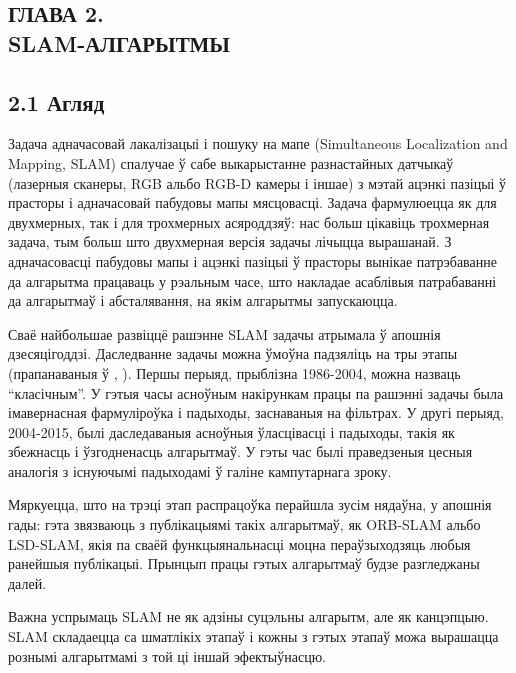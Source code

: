 \begin{center}
    \section*{ГЛАВА 2. \\ SLAM-АЛГАРЫТМЫ}
\end{center}

\subsection*{2.1 Агляд}

Задача адначасовай лакалізацыі і пошуку на мапе (Simultaneous Localization and Mapping, SLAM)
спалучае ў сабе выкарыстанне разнастайных датчыкаў (лазерныя сканеры, RGB альбо RGB-D
камеры і іншае) з мэтай ацэнкі пазіцыі ў прасторы і адначасовай пабудовы мапы мясцовасці.
Задача фармулюецца як для двухмерных, так і для трохмерных асяроддзяў: нас больш цікавіць
трохмерная задача, тым больш што двухмерная версія задачы лічыцца вырашанай. З адначасовасці
пабудовы мапы і ацэнкі пазіцыі ў прасторы вынікае патрэбаванне да алгарытма працаваць у рэальным часе,
што накладае асаблівыя патрабаванні да алгарытмаў і абсталявання, на якім алгарытмы запускаюцца.

Сваё найбольшае развіццё рашэнне SLAM задачы атрымала ў апошнія дзесяцігоддзі. Даследванне
задачы можна ўмоўна падзяліць на тры этапы (прапанаваныя ў \cite{DBLP:journals/corr/CadenaCCLSN0L16},
\cite{Li2016RealtimeSL}). Першы перыяд, прыблізна 1986-2004, можна назваць ``класічным''.
У гэтыя часы асноўным накірункам працы па рашэнні задачы была імавернасная фармуліроўка
і падыходы, заснаваныя на фільтрах. У другі перыяд, 2004-2015, былі даследаваныя асноўныя
ўласцівасці і падыходы, такія як збежнасць і ўзгодненасць алгарытмаў. У гэты час былі
праведзеныя цесныя аналогія з існуючымі падыходамі ў галіне кампутарнага зроку.

Мяркуецца, што на трэці этап распрацоўка перайшла зусім нядаўна, у апошнія гады: гэта звязваюць
з публікацыямі такіх алгарытмаў, як ORB-SLAM альбо LSD-SLAM, якія па сваёй
функцыянальнасці моцна пераўзыходзяць любыя ранейшыя публікацыі. Прынцып працы гэтых алгарытмаў
будзе разгледжаны далей.

Важна успрымаць SLAM не як адзіны суцэльны алгарытм, але як канцэпцыю. SLAM складаецца са
шматлікіх этапаў і кожны з гэтых этапаў можа вырашацца рознымі алгарытмамі з той ці іншай эфектыўнасцю.

